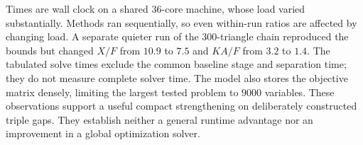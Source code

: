 Times are wall clock on a shared $36$-core machine, whose load varied
substantially. Methods ran sequentially, so even within-run ratios
are affected by changing load. A separate quieter run of the
$300$-triangle chain reproduced the bounds but changed $X/F$
from $10.9$ to $7.5$ and $KA/F$ from $3.2$ to $1.4$.
The tabulated solve times exclude the common baseline stage and
separation time; they do not measure complete solver time.
The model also stores the objective matrix densely, limiting the
largest tested problem to $9000$ variables. These observations
support a useful compact strengthening on deliberately constructed
triple gaps. They establish neither a general runtime advantage nor
an improvement in a global optimization solver.
